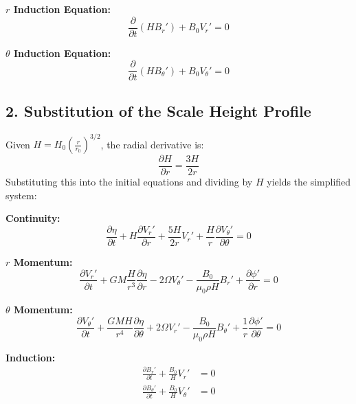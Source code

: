 \documentclass[11pt]{article}
\begin{document}
\textbf{$r$ Induction Equation:}
\begin{equation}
\frac{\partial}{\partial t}(H B_r') + B_0 V_r' = 0
\end{equation}

\textbf{$\theta$ Induction Equation:}
\begin{equation}
\frac{\partial}{\partial t}(H B_\theta') + B_0 V_\theta' = 0
\end{equation}

\subsection*{2. Substitution of the Scale Height Profile}
Given $H = H_0 \left( \frac{r}{r_0} \right)^{3/2}$, the radial derivative is:
\begin{equation}
\frac{\partial H}{\partial r} = \frac{3H}{2r}
\end{equation}
Substituting this into the initial equations and dividing by $H$ yields the simplified system:

\textbf{Continuity:}
\begin{equation}
\frac{\partial \eta}{\partial t} + H \frac{\partial V_r'}{\partial r} + \frac{5H}{2r} V_r' + \frac{H}{r} \frac{\partial V_\theta'}{\partial \theta} = 0
\end{equation}

\textbf{$r$ Momentum:}
\begin{equation}
\frac{\partial V_r'}{\partial t} + GM \frac{H}{r^3} \frac{\partial \eta}{\partial r} - 2\Omega V_\theta' - \frac{B_0}{\mu_0 \rho H} B_r' + \frac{\partial \phi'}{\partial r} = 0
\end{equation}

\textbf{$\theta$ Momentum:}
\begin{equation}
\frac{\partial V_\theta'}{\partial t} + \frac{GM H}{r^4} \frac{\partial \eta}{\partial \theta} + 2 \Omega V_r' - \frac{B_0}{\mu_0 \rho H} B_\theta' + \frac{1}{r} \frac{\partial \phi'}{\partial \theta} = 0
\end{equation}

\textbf{Induction:}
\begin{align}
\frac{\partial B_r'}{\partial t} + \frac{B_0}{H} V_r' &= 0 \\
\frac{\partial B_\theta'}{\partial t} + \frac{B_0}{H} V_\theta' &= 0
\end{align}
\end{document}

